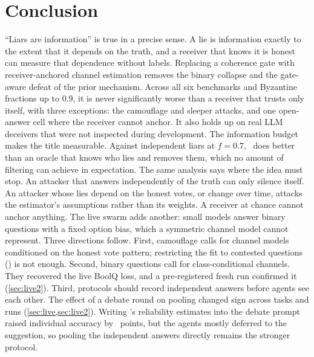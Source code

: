 \section{Conclusion}\label{sec:conclusion}

``Liars are information'' is true in a precise sense. A lie is information exactly to the extent that it depends on the truth, and a receiver that knows it is honest can measure that dependence without labels. Replacing a coherence gate with receiver-anchored channel estimation removes the binary collapse and the gate-aware defeat of the prior mechanism. Across all six benchmarks and Byzantine fractions up to $0.9$, it is never significantly worse than a receiver that trusts only itself, with three exceptions: the camouflage and sleeper attacks, and one open-answer cell where the receiver cannot anchor. It also holds up on real LLM deceivers that were not inspected during development. The information budget makes the title measurable. Against independent liars at $f=0.7$, \race\ does better than an oracle that knows who lies and removes them, which no amount of filtering can achieve in expectation. The same analysis says where the idea must stop. An attacker that answers independently of the truth can only silence itself. An attacker whose lies depend on the honest votes, or change over time, attacks the estimator's assumptions rather than its weights. A receiver at chance cannot anchor anything. The live swarm adds another: small models answer binary questions with a fixed option bias, which a symmetric channel model cannot represent. Three directions follow. First, camouflage calls for channel models conditioned on the honest vote pattern; restricting the fit to contested questions (\raceD) is not enough. Second, binary questions call for class-conditional channels. They recovered the live BoolQ loss, and a pre-registered fresh run confirmed it (\cref{sec:live2}). Third, protocols should record independent answers before agents see each other. The effect of a debate round on pooling changed sign across tasks and runs (\cref{sec:live,sec:live2}). Writing \race's reliability estimates into the debate prompt raised individual accuracy by \informedDelta\ points, but the agents mostly deferred to the suggestion, so pooling the independent answers directly remains the stronger protocol.


